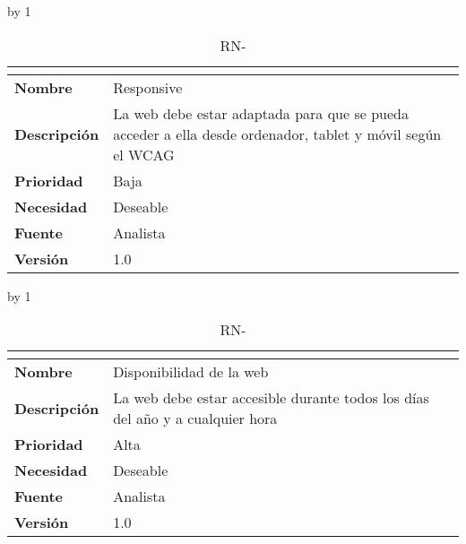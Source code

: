 \advance\rn by 1
\begin{table}[H]
	\caption{RN-\number\rn}
	\begin{tabular}{|l|p{}|}
		\hline
		\multicolumn{2}{|c|}{\cellcolor[HTML]{BFBFBF}{\color[HTML]{000000} \textbf{RN-\number\rn}}} \\ \hline
		\textbf{Nombre}      & Responsive                                                                                                                                 \\ \hline
		\textbf{Descripción} & La web debe estar adaptada para que se pueda acceder a ella desde ordenador, tablet y móvil según el WCAG \cite{initiative_wai_web_nodate} \\ \hline
		\textbf{Prioridad}   & Baja                                                                                                                                       \\ \hline
		\textbf{Necesidad}   & Deseable                                                                                                                                   \\ \hline
		\textbf{Fuente}      & Analista                                                                                                                                   \\ \hline
		\textbf{Versión}     & 1.0                                                                                                                                        \\ \hline
	\end{tabular}
\end{table}
\advance\rn by 1
\begin{table}[H]
	\caption{RN-\number\rn}
	\begin{tabular}{|l|p{}|}
		\hline
		\multicolumn{2}{|c|}{\cellcolor[HTML]{BFBFBF}{\color[HTML]{000000} \textbf{RN-\number\rn}}} \\ \hline
		\textbf{Nombre}      & Disponibilidad de la web                                                      \\ \hline
		\textbf{Descripción} & La web debe estar accesible durante todos los días del año y a cualquier hora \\ \hline
		\textbf{Prioridad}   & Alta                                                                          \\ \hline
		\textbf{Necesidad}   & Deseable                                                                      \\ \hline
		\textbf{Fuente}      & Analista                                                                      \\ \hline
		\textbf{Versión}     & 1.0                                                                           \\ \hline
	\end{tabular}
\end{table}
